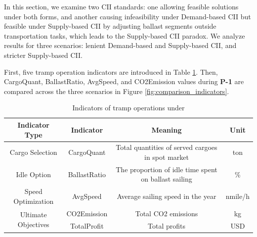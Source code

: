 \documentclass[11pt,english]{article}
\begin{document}
In this section, we examine two CII standards: one allowing feasible solutions under both forms, and another causing infeasibility under Demand-based CII but feasible under Supply-based CII by adjusting ballast segments outside transportation tasks, which leads to the Supply-based CII paradox. We analyze results for three scenarios: lenient Demand-based and Supply-based CII, and stricter Supply-based CII.

First, five tramp operation indicators are introduced in Table \ref{tab:tramp_indicators}. Then, CargoQuant, BallastRatio, AvgSpeed, and CO2Emission values during \textbf{P-1} are compared across the three scenarios in Figure \ref{fig:comparison_indicators}.

\begin{table}[!h]
    \centering
    \begin{tabular}{cccc}
    \toprule
    \textbf{Indicator Type} & \textbf{Indicator} & \textbf{Meaning} & \textbf{Unit} \\ \toprule
    Cargo Selection & CargoQuant & Total quantities of served cargoes in spot market & ton \\ \hline
    Idle Option & BallastRatio & The proportion of idle time spent on ballast sailing & \% \\ \hline
    Speed Optimization & AvgSpeed & Average sailing speed in the year & nmile/h \\ \hline
    \multirow{2}{*}{Ultimate Objectives} & CO2Emission & Total CO2 emissions & kg \\ \cline{2-4}
     & TotalProfit & Total profits & USD \\ 
    \bottomrule
    \end{tabular}
    \caption{Indicators of tramp operations under}
    \label{tab:tramp_indicators}
\end{table}
\end{document}
